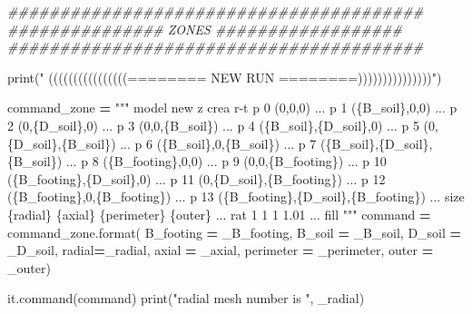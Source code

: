 \documentclass[a4paper, nobind]{templates/ociamthesis}
\newenvironment{Shaded}{\begin{snugshade}}{\end{snugshade}}
\newcommand{\BuiltInTok}[1]{#1}
\newcommand{\CommentTok}[1]{\textcolor[rgb]{0.56,0.35,0.01}{\textit{#1}}}
\newcommand{\NormalTok}[1]{#1}
\newcommand{\OperatorTok}[1]{\textcolor[rgb]{0.81,0.36,0.00}{\textbf{#1}}}
\newcommand{\SpecialCharTok}[1]{\textcolor[rgb]{0.00,0.00,0.00}{#1}}
\newcommand{\StringTok}[1]{\textcolor[rgb]{0.31,0.60,0.02}{#1}}
\renewenvironment{Shaded}
{
  \vspace{10pt}%
  \begin{snugshade}%
}{%
  \end{snugshade}%
  \vspace{8pt}%
}
\begin{document}
\begin{Shaded}
\begin{Highlighting}[]
\CommentTok{\#\#\#\#\#\#\#\#\#\#\#\#\#\#\#\#\#\#\#\#\#\#\#\#\#\#\#\#\#\#\#\#\#\#\#\#\#\#\#\#}
\CommentTok{\#\#\#\#\#\#\#\#\#\#\#\#\#\#\# ZONES \#\#\#\#\#\#\#\#\#\#\#\#\#\#\#\#\#\#}
\CommentTok{\#\#\#\#\#\#\#\#\#\#\#\#\#\#\#\#\#\#\#\#\#\#\#\#\#\#\#\#\#\#\#\#\#\#\#\#\#\#\#\#}

\BuiltInTok{print}\NormalTok{(}\StringTok{"               ((((((((((((((((======== NEW RUN ========)))))))))))))))"}\NormalTok{)}

\NormalTok{command\_zone }\OperatorTok{=} \StringTok{"""}
\StringTok{model new}
\StringTok{z crea r{-}t p 0 (0,0,0) ...}
\StringTok{           p 1 (}\SpecialCharTok{\{B\_soil\}}\StringTok{,0,0) ...}
\StringTok{           p 2 (0,}\SpecialCharTok{\{D\_soil\}}\StringTok{,0) ...}
\StringTok{           p 3 (0,0,}\SpecialCharTok{\{B\_soil\}}\StringTok{) ...}
\StringTok{           p 4 (}\SpecialCharTok{\{B\_soil\}}\StringTok{,}\SpecialCharTok{\{D\_soil\}}\StringTok{,0) ...}
\StringTok{           p 5 (0,}\SpecialCharTok{\{D\_soil\}}\StringTok{,}\SpecialCharTok{\{B\_soil\}}\StringTok{) ...}
\StringTok{           p 6 (}\SpecialCharTok{\{B\_soil\}}\StringTok{,0,}\SpecialCharTok{\{B\_soil\}}\StringTok{) ...}
\StringTok{           p 7 (}\SpecialCharTok{\{B\_soil\}}\StringTok{,}\SpecialCharTok{\{D\_soil\}}\StringTok{,}\SpecialCharTok{\{B\_soil\}}\StringTok{) ...}
\StringTok{           p 8 (}\SpecialCharTok{\{B\_footing\}}\StringTok{,0,0) ...}
\StringTok{           p 9 (0,0,}\SpecialCharTok{\{B\_footing\}}\StringTok{) ...}
\StringTok{           p 10 (}\SpecialCharTok{\{B\_footing\}}\StringTok{,}\SpecialCharTok{\{D\_soil\}}\StringTok{,0) ...}
\StringTok{           p 11 (0,}\SpecialCharTok{\{D\_soil\}}\StringTok{,}\SpecialCharTok{\{B\_footing\}}\StringTok{) ...}
\StringTok{           p 12 (}\SpecialCharTok{\{B\_footing\}}\StringTok{,0,}\SpecialCharTok{\{B\_footing\}}\StringTok{) ...}
\StringTok{           p 13 (}\SpecialCharTok{\{B\_footing\}}\StringTok{,}\SpecialCharTok{\{D\_soil\}}\StringTok{,}\SpecialCharTok{\{B\_footing\}}\StringTok{) ...}
\StringTok{           size }\SpecialCharTok{\{radial\}}\StringTok{ }\SpecialCharTok{\{axial\}}\StringTok{ }\SpecialCharTok{\{perimeter\}}\StringTok{ }\SpecialCharTok{\{outer\}}\StringTok{ ...}
\StringTok{           rat 1 1 1 1.01 ...}
\StringTok{           fill}
\StringTok{"""}
\NormalTok{command }\OperatorTok{=}\NormalTok{ command\_zone.}\BuiltInTok{format}\NormalTok{(}
\NormalTok{B\_footing }\OperatorTok{=}\NormalTok{ \_B\_footing,}
\NormalTok{B\_soil }\OperatorTok{=}\NormalTok{ \_B\_soil,}
\NormalTok{D\_soil }\OperatorTok{=}\NormalTok{ \_D\_soil,}
\NormalTok{radial}\OperatorTok{=}\NormalTok{\_radial,}
\NormalTok{axial }\OperatorTok{=}\NormalTok{ \_axial,}
\NormalTok{perimeter }\OperatorTok{=}\NormalTok{ \_perimeter,}
\NormalTok{outer }\OperatorTok{=}\NormalTok{ \_outer)}

\NormalTok{it.command(command)}
\BuiltInTok{print}\NormalTok{(}\StringTok{"radial mesh number is "}\NormalTok{, \_radial)}
\end{Highlighting}
\end{Shaded}
\end{document}
